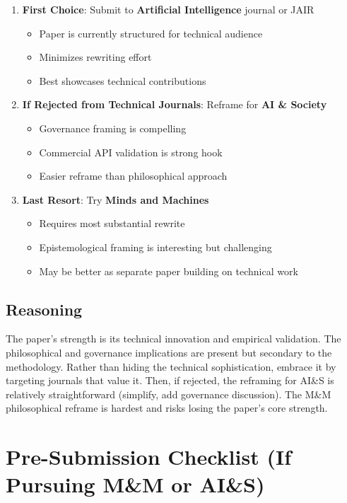 \documentclass[12pt]{article}
\begin{document}
\begin{enumerate}[leftmargin=*]
\item \textbf{First Choice}: Submit to \textbf{Artificial Intelligence} journal or JAIR
   \begin{itemize}
   \item Paper is currently structured for technical audience
   \item Minimizes rewriting effort
   \item Best showcases technical contributions
   \end{itemize}

\item \textbf{If Rejected from Technical Journals}: Reframe for \textbf{AI \& Society}
   \begin{itemize}
   \item Governance framing is compelling
   \item Commercial API validation is strong hook
   \item Easier reframe than philosophical approach
   \end{itemize}

\item \textbf{Last Resort}: Try \textbf{Minds and Machines}
   \begin{itemize}
   \item Requires most substantial rewrite
   \item Epistemological framing is interesting but challenging
   \item May be better as separate paper building on technical work
   \end{itemize}
\end{enumerate}

\subsection{Reasoning}

The paper's strength is its technical innovation and empirical validation. The philosophical and governance implications are present but secondary to the methodology. Rather than hiding the technical sophistication, embrace it by targeting journals that value it. Then, if rejected, the reframing for AI\&S is relatively straightforward (simplify, add governance discussion). The M\&M philosophical reframe is hardest and risks losing the paper's core strength.

\section{Pre-Submission Checklist (If Pursuing M\&M or AI\&S)}
\end{document}
